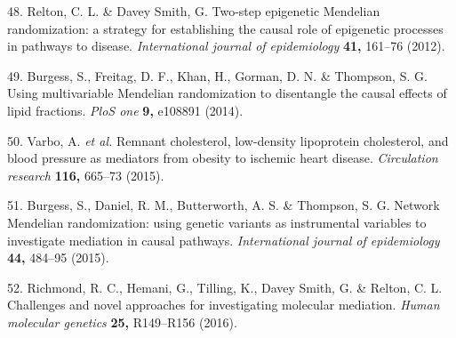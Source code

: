 \documentclass[]{article}
\begin{document}
\hypertarget{ref-Relton2012}{}
48. Relton, C. L. \& Davey Smith, G. Two-step epigenetic Mendelian
randomization: a strategy for establishing the causal role of epigenetic
processes in pathways to disease. \emph{International journal of
epidemiology} \textbf{41,} 161--76 (2012).

\hypertarget{ref-Burgess2014a}{}
49. Burgess, S., Freitag, D. F., Khan, H., Gorman, D. N. \& Thompson, S.
G. Using multivariable Mendelian randomization to disentangle the causal
effects of lipid fractions. \emph{PloS one} \textbf{9,} e108891 (2014).

\hypertarget{ref-Varbo2015}{}
50. Varbo, A. \emph{et al.} Remnant cholesterol, low-density lipoprotein
cholesterol, and blood pressure as mediators from obesity to ischemic
heart disease. \emph{Circulation research} \textbf{116,} 665--73 (2015).

\hypertarget{ref-Burgess2015}{}
51. Burgess, S., Daniel, R. M., Butterworth, A. S. \& Thompson, S. G.
Network Mendelian randomization: using genetic variants as instrumental
variables to investigate mediation in causal pathways.
\emph{International journal of epidemiology} \textbf{44,} 484--95
(2015).

\hypertarget{ref-Richmond2016}{}
52. Richmond, R. C., Hemani, G., Tilling, K., Davey Smith, G. \& Relton,
C. L. Challenges and novel approaches for investigating molecular
mediation. \emph{Human molecular genetics} \textbf{25,} R149--R156
(2016).
\end{document}
